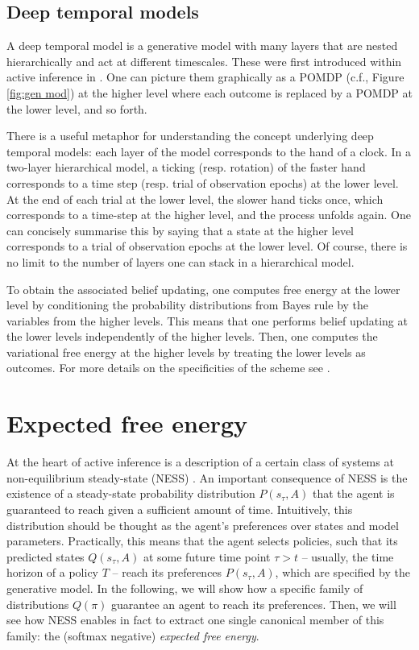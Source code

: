 \documentclass{article}
\begin{document}
\subsection{Deep temporal models}
\label{appendix: deep temporal models}

A deep temporal model is a generative model with many layers that are nested hierarchically and act at different timescales. These were first introduced within active inference in \cite{fristonActiveInferenceCuriosity2017}. One can picture them graphically as a POMDP (c.f., Figure \ref{fig:gen mod}) at the higher level where each outcome is replaced by a POMDP at the lower level, and so forth.

There is a useful metaphor for understanding the concept underlying deep temporal models: each layer of the model corresponds to the hand of a clock. In a two-layer hierarchical model, a ticking (resp. rotation) of the faster hand corresponds to a time step (resp. trial of observation epochs) at the lower level. At the end of each trial at the lower level, the slower hand ticks once, which corresponds to a time-step at the higher level, and the process unfolds again. One can concisely summarise this by saying that a state at the higher level corresponds to a trial of observation epochs at the lower level. Of course, there is no limit to the number of layers one can stack in a hierarchical model.

To obtain the associated belief updating, one computes free energy at the lower level by conditioning the probability distributions from Bayes rule by the variables from the higher levels. This means that one performs belief updating at the lower levels independently of the higher levels. Then, one computes the variational free energy at the higher levels by treating the lower levels as outcomes. For more details on the specificities of the scheme see \cite{fristonActiveInferenceCuriosity2017}.


\section{Expected free energy}
\label{Appendix:steady-state lemma}

At the heart of active inference is a description of a certain class of systems at non-equilibrium steady-state (NESS) \cite{parrMarkovBlanketsInformation2019,fristonFreeEnergyPrinciple2019}. An important consequence of NESS is the existence of a steady-state probability distribution $P(s_\tau,A)$ that the agent is guaranteed to reach given a sufficient amount of time. Intuitively, this distribution should be thought as the agent's preferences over states and model parameters. Practically, this means that the agent selects policies, such that its predicted states $Q(s_\tau,A)$ at some future time point $\tau >t$ -- usually, the time horizon of a policy $T$ -- reach its preferences $P(s_\tau,A)$, which are specified by the generative model. In the following, we will show how a specific family of distributions $Q(\pi)$ guarantee an agent to reach its preferences. Then, we will see how NESS enables in fact to extract one single canonical member of this family: the (softmax negative) \textit{expected free energy}.
\end{document}
